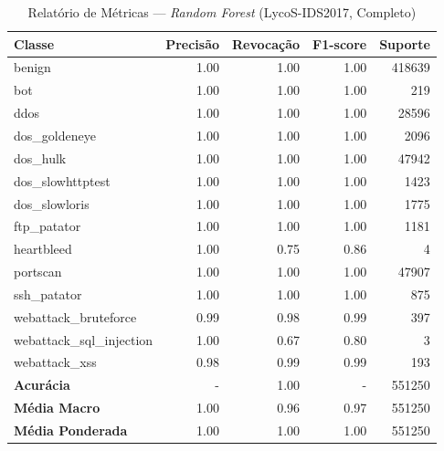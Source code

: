 \begin{table}[H]
    \centering
    \small
    \begin{tabular}{lrrrr}
        \hline
        Classe                    & Precisão & Revocação & F1-score & Suporte \\
        \hline
        benign                    & 1.00     & 1.00      & 1.00     & 418639  \\
        bot                       & 1.00     & 1.00      & 1.00     & 219     \\
        ddos                      & 1.00     & 1.00      & 1.00     & 28596   \\
        dos\_goldeneye            & 1.00     & 1.00      & 1.00     & 2096    \\
        dos\_hulk                 & 1.00     & 1.00      & 1.00     & 47942   \\
        dos\_slowhttptest         & 1.00     & 1.00      & 1.00     & 1423    \\
        dos\_slowloris            & 1.00     & 1.00      & 1.00     & 1775    \\
        ftp\_patator              & 1.00     & 1.00      & 1.00     & 1181    \\
        heartbleed                & 1.00     & 0.75      & 0.86     & 4       \\
        portscan                  & 1.00     & 1.00      & 1.00     & 47907   \\
        ssh\_patator              & 1.00     & 1.00      & 1.00     & 875     \\
        webattack\_bruteforce     & 0.99     & 0.98      & 0.99     & 397     \\
        webattack\_sql\_injection & 1.00     & 0.67      & 0.80     & 3       \\
        webattack\_xss            & 0.98     & 0.99      & 0.99     & 193     \\
        \hline
        \textbf{Acurácia}         & -        & 1.00      & -        & 551250  \\
        \textbf{Média Macro}      & 1.00     & 0.96      & 0.97     & 551250  \\
        \textbf{Média Ponderada}  & 1.00     & 1.00      & 1.00     & 551250  \\
        \hline
    \end{tabular}
    \caption{Relatório de Métricas — \textit{Random Forest} (LycoS-IDS2017, Completo)}
    \label{table:rf_lycos_completo_metricas}
\end{table}
